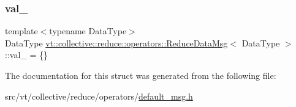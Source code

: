 \mbox{\label{structvt_1_1collective_1_1reduce_1_1operators_1_1_reduce_data_msg_a3d393a0bf3245aeac348b66be4e566f9}} 
\subsubsection{\texorpdfstring{val\+\_\+}{val\_}}
{\footnotesize\ttfamily template$<$typename Data\+Type$>$ \\
Data\+Type \hyperlink{structvt_1_1collective_1_1reduce_1_1operators_1_1_reduce_data_msg}{vt\+::collective\+::reduce\+::operators\+::\+Reduce\+Data\+Msg}$<$ Data\+Type $>$\+::val\+\_\+ = \{\}\hspace{0.3cm}{\ttfamily [protected]}}



The documentation for this struct was generated from the following file\+:\begin{DoxyCompactItemize}
\item 
src/vt/collective/reduce/operators/\hyperlink{default__msg_8h}{default\+\_\+msg.\+h}\end{DoxyCompactItemize}
